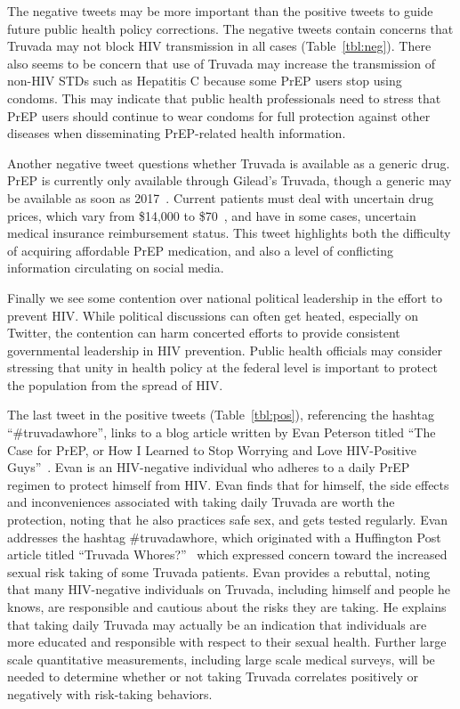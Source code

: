 \documentclass[conference]{IEEEtran}
\begin{document}
The negative tweets may be more important than the positive tweets to guide future public health policy corrections. The negative tweets contain concerns that Truvada may not block HIV transmission in all cases (Table~\ref{tbl:neg}). There also seems to be concern that use of Truvada may increase the transmission of non-HIV STDs such as Hepatitis C because some PrEP users stop using condoms. This may indicate that public health professionals need to stress that PrEP users should continue to wear condoms for full protection against other diseases when disseminating PrEP-related health information.

Another negative tweet questions whether Truvada is available as a generic drug. PrEP is currently only available through Gilead's Truvada, though a generic may be available as soon as 2017~\cite{truvadagenericblog}. Current patients must deal with uncertain drug prices, which vary from \$14,000 to \$70~\cite{truvadagenericblog}, and have in some cases, uncertain medical insurance reimbursement status. This tweet highlights both the difficulty of acquiring affordable PrEP medication, and also a level of conflicting information circulating on social media.

Finally we see some contention over national political leadership in the effort to prevent HIV. While political discussions can often get heated, especially on Twitter, the contention can harm concerted efforts to provide consistent governmental leadership in HIV prevention. Public health officials may consider stressing that unity in health policy at the federal level is important to protect the population from the spread of HIV.

The last tweet in the positive tweets (Table~\ref{tbl:pos}), referencing the hashtag ``\#truvadawhore'', links to a blog article written by Evan Peterson titled ``The Case for PrEP, or How I Learned to Stop Worrying and Love HIV-Positive Guys''~\cite{caseforprep}. Evan is an HIV-negative individual who adheres to a daily PrEP regimen to protect himself from HIV. Evan finds that for himself, the side effects and inconveniences associated with taking daily Truvada are worth the protection, noting that he also practices safe sex, and gets tested regularly. Evan addresses the hashtag \#truvadawhore, which originated with a Huffington Post article titled ``Truvada Whores?''~\cite{truvadawhore} which expressed concern toward the increased sexual risk taking of some Truvada patients. Evan provides a rebuttal, noting that many HIV-negative individuals on Truvada, including himself and people he knows, are responsible and cautious about the risks they are taking. He explains that taking daily Truvada may actually be an indication that individuals are more educated and responsible with respect to their sexual health. Further large scale quantitative measurements, including large scale medical surveys, will be needed to determine whether or not taking Truvada correlates positively or negatively with risk-taking behaviors.
\end{document}
